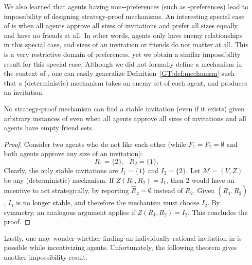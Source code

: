 We also learned that agents having non-\INC-preferences (such as \DEC-preferences) lead to impossibility of designing strategy-proof mechanisms. An interesting special case of \SIPs is when all agents approve all sizes of invitations and prefer all sizes equally and have no friends at all. In other words, agents only have enemy relationships in this special case, and sizes of an invitation or friends do not matter at all. This is a very restrictive domain of preferences, yet we obtain a similar impossibility result for this special case. Although we did not formally define a mechanism in the context of \SIP, one can easily generalize Definition~\ref{GT:def:mechanism} such that a (deterministic) mechanism takes an enemy set of each agent, and produces an invitation.

\begin{theorem} \label{GT:thm:impossibility_only_enemies}
No strategy-proof mechanism can find a stable invitation (even if it exists) given arbitrary instances of \SIPs even when all agents approve all sizes of invitations and all agents have empty friend sets. 
\end{theorem}
\begin{proof}
Consider two agents who do not like each other (while $F_1=F_2=\emptyset$ and both agents approve any size of an invitation):
	\begin{equation*}
			R_1 = \{2\}, ~~~ R_2 = \{1\}.
	\end{equation*}
	Clearly, the only stable invitations are $I_1 = \{1\}$ and $I_2 = \{2\}$. 
	Let $\mathcal{M} = (V, Z)$ be any (deterministic) mechanism.	
	If $Z(R_1, R_2) = I_1$, then $2$ would have an incentive to act strategically, by reporting $\hat{R}_2 = \emptyset$ instead of $R_2$. Given $(R_1, \hat{R}_2)$, $I_1$ is no longer stable, and therefore the mechanism must choose $I_2$. By symmetry, an analogous argument applies if $Z(R_1, R_2) = I_2$. This concludes the proof. 
\end{proof}


Lastly, one may wonder whether finding an individually rational invitation in \AOIPs is possible while incentivizing agents. Unfortunately, the following theorem gives another impossibility result. 

